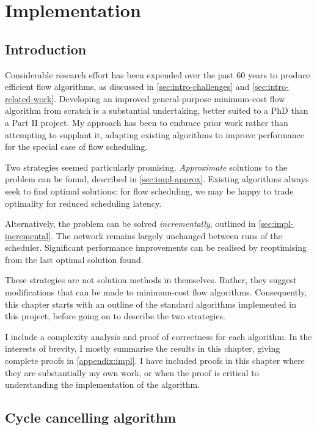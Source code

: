\chapter{Implementation} \label{chap:impl}

\section{Introduction}


Considerable research effort has been expended over the past 60 years to produce efficient flow algorithms, as discussed in \cref{sec:intro-challenges} and \cref{sec:intro-related-work}. Developing an improved general-purpose minimum-cost flow algorithm from scratch is a substantial undertaking, better suited to a PhD than a Part II project. My approach has been to embrace prior work rather than attempting to supplant it, adapting existing algorithms to improve performance for the special case of flow scheduling.

Two strategies seemed particularly promising. \emph{Approximate} solutions to the problem can be found, described in \cref{sec:impl-approx}. Existing algorithms always seek to find optimal solutions: for flow scheduling, we may be happy to trade optimality for reduced scheduling latency. 

Alternatively, the problem can be solved \emph{incrementally}, outlined in \cref{sec:impl-incremental}. The network remains largely unchanged between runs of the scheduler. Significant performance improvements can be realised by reoptimising from the last optimal solution found.

These strategies are not solution methods in themselves. Rather, they suggest modifications that can be made to minimum-cost flow algorithms. Consequently, this chapter starts with an outline of the standard algorithms implemented in this project, before going on to describe the two strategies.

I include a complexity analysis and proof of correctness for each algorithm. In the interests of brevity, I mostly summarise the results in this chapter, giving complete proofs in \cref{appendix:impl}. I have included proofs in this chapter where they are substantially my own work, or when the proof is critical to understanding the implementation of the algorithm.

\section{Cycle cancelling algorithm} \label{sec:impl-cycle-cancelling}

